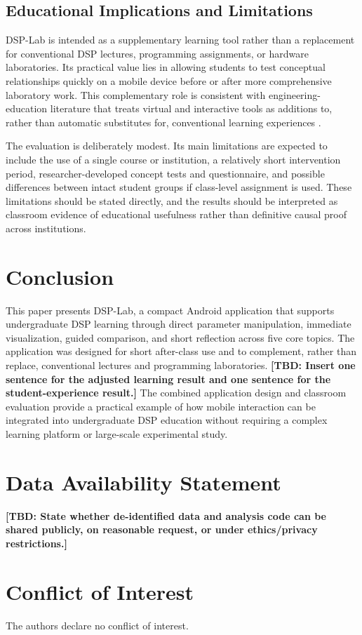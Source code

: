 \documentclass[11pt,a4paper]{article}
\newcommand{\tbd}[1]{\textbf{[TBD: #1]}}
\begin{document}
\subsection{Educational Implications and Limitations}
DSP-Lab is intended as a supplementary learning tool rather than a replacement for conventional DSP lectures, programming assignments, or hardware laboratories. Its practical value lies in allowing students to test conceptual relationships quickly on a mobile device before or after more comprehensive laboratory work. This complementary role is consistent with engineering-education literature that treats virtual and interactive tools as additions to, rather than automatic substitutes for, conventional learning experiences \citep{li2024}.

The evaluation is deliberately modest. Its main limitations are expected to include the use of a single course or institution, a relatively short intervention period, researcher-developed concept tests and questionnaire, and possible differences between intact student groups if class-level assignment is used. These limitations should be stated directly, and the results should be interpreted as classroom evidence of educational usefulness rather than definitive causal proof across institutions.

\section{Conclusion}
This paper presents DSP-Lab, a compact Android application that supports undergraduate DSP learning through direct parameter manipulation, immediate visualization, guided comparison, and short reflection across five core topics. The application was designed for short after-class use and to complement, rather than replace, conventional lectures and programming laboratories. \tbd{Insert one sentence for the adjusted learning result and one sentence for the student-experience result.} The combined application design and classroom evaluation provide a practical example of how mobile interaction can be integrated into undergraduate DSP education without requiring a complex learning platform or large-scale experimental study.

\section*{Data Availability Statement}
\tbd{State whether de-identified data and analysis code can be shared publicly, on reasonable request, or under ethics/privacy restrictions.}

\section*{Conflict of Interest}
The authors declare no conflict of interest.



\end{document}
